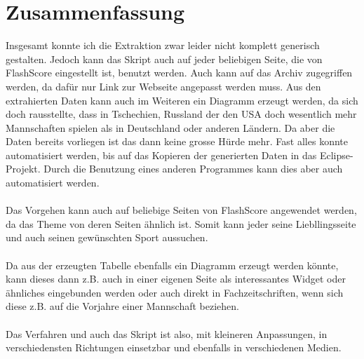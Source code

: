 \chapter{Zusammenfassung}
Insgesamt konnte ich die Extraktion zwar leider nicht komplett generisch gestalten. Jedoch kann das Skript auch auf jeder beliebigen Seite, die von FlashScore eingestellt ist, benutzt werden.
Auch kann auf das Archiv zugegriffen werden, da daf\"ur nur Link zur Webseite angepasst werden muss.
Aus den extrahierten Daten kann auch im Weiteren ein Diagramm erzeugt werden, da sich doch rausstellte, dass in Tschechien, Russland der den USA doch wesentlich mehr Mannschaften spielen als in Deutschland oder anderen L\"andern.
Da aber die Daten bereits vorliegen ist das dann keine grosse H\"urde mehr.
Fast alles konnte automatisiert werden, bis auf das Kopieren der generierten Daten in das Eclipse-Projekt. 
Durch die Benutzung eines anderen Programmes kann dies aber auch automatisiert werden.\\
\\
Das Vorgehen kann auch auf beliebige Seiten von FlashScore angewendet werden, da das Theme von deren Seiten \"ahnlich ist.
Somit kann jeder seine Liebllingsseite und auch seinen gew\"unschten Sport aussuchen.\\
\\
Da aus der erzeugten Tabelle ebenfalls ein Diagramm erzeugt werden k\"onnte, kann dieses dann z.B. auch in einer eigenen Seite als interessantes Widget oder \"ahnliches eingebunden werden oder auch direkt in Fachzeitschriften, wenn sich diese z.B. auf die Vorjahre einer Mannschaft beziehen.\\
\\
Das Verfahren und auch das Skript ist also, mit kleineren Anpassungen, in verschiedensten Richtungen einsetzbar und ebenfalls in verschiedenen Medien.

